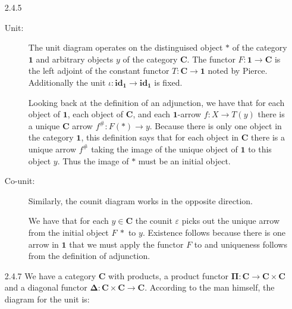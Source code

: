 \documentclass{article}
\newcommand{\one}{\mathbf{1}}
\newcommand{\cat}{\mathbf{C}}
\newcommand{\id}{\mathbf{id}}
\newcommand{\pifun}{\mathbf{\Pi}}
\newcommand{\diagfun}{\mathbf{\Delta}}
\begin{document}
\begin{enumerate}
\item [2.4.5]
  \begin{description}
  \item [Unit:]
    The unit diagram operates on the distinguised object $*$ of the category $\one$ and arbitrary objects $y$ of the category $\cat$.
    The functor $F : \one \rightarrow \cat$ is the left adjoint of the constant functor $T : \cat \rightarrow \one$ noted by Pierce.
    Additionally the unit $\iota : \id_\one \rightarrow \id_\one$ is fixed.
    \begin{center}
    \end{center}
    Looking back at the definition of an adjunction, we have that for each object of $\one$, each object of $\cat$, and each $\one$-arrow $f: X \rightarrow T(y)$ there is a unique $\cat$ arrow $f^{\#} : F(*) \rightarrow y$.
    Because there is only one object in the category $\one$, this definition says that for each object in $\cat$ there is a unique arrow $f^{\#}$ taking the image of the unique object of $\one$ to this object $y$.
    Thus the image of $*$ must be an initial object.

  \vfill{}
  \item [Co-unit:]
    Similarly, the counit diagram works in the opposite direction.
    \begin{center}
    \end{center}
    We have that for each $y \in \cat$ the counit $\varepsilon$ picks out the unique arrow from the initial object $F~*$ to $y$.
    Existence follows because there is one arrow in $\one$ that we must apply the functor $F$ to and uniqueness follows from the definition of adjunction.
  \end{description}
  \vfill{}
\newpage
\item[2.4.7]
  We have a category $\cat$ with products, a product functor $\pifun : \cat \rightarrow \cat \times \cat$ and a diagonal functor $\diagfun : \cat \times \cat \rightarrow \cat$.
  According to the man himself, the diagram for the unit is:
  \begin{center}
\end{center}
\end{enumerate}
\end{document}
